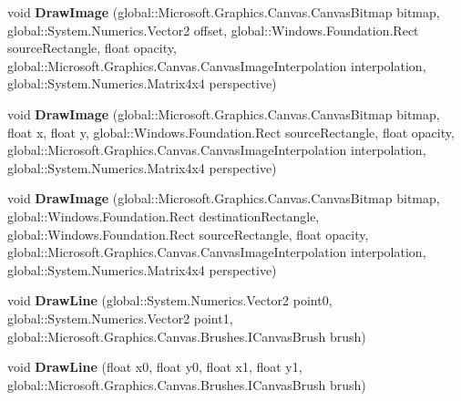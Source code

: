 \begin{DoxyCompactItemize}
void {\bfseries Draw\+Image} (global\+::\+Microsoft.\+Graphics.\+Canvas.\+Canvas\+Bitmap bitmap, global\+::\+System.\+Numerics.\+Vector2 offset, global\+::\+Windows.\+Foundation.\+Rect source\+Rectangle, float opacity, global\+::\+Microsoft.\+Graphics.\+Canvas.\+Canvas\+Image\+Interpolation interpolation, global\+::\+System.\+Numerics.\+Matrix4x4 perspective)
\item 
\mbox{\label{interface_microsoft_1_1_graphics_1_1_canvas_1_1_i_canvas_drawing_session_a54c1165443e61a4fb85bec846c49b766}} 
void {\bfseries Draw\+Image} (global\+::\+Microsoft.\+Graphics.\+Canvas.\+Canvas\+Bitmap bitmap, float x, float y, global\+::\+Windows.\+Foundation.\+Rect source\+Rectangle, float opacity, global\+::\+Microsoft.\+Graphics.\+Canvas.\+Canvas\+Image\+Interpolation interpolation, global\+::\+System.\+Numerics.\+Matrix4x4 perspective)
\item 
\mbox{\label{interface_microsoft_1_1_graphics_1_1_canvas_1_1_i_canvas_drawing_session_a7a0435e8e3e350ce01e58979f448a53d}} 
void {\bfseries Draw\+Image} (global\+::\+Microsoft.\+Graphics.\+Canvas.\+Canvas\+Bitmap bitmap, global\+::\+Windows.\+Foundation.\+Rect destination\+Rectangle, global\+::\+Windows.\+Foundation.\+Rect source\+Rectangle, float opacity, global\+::\+Microsoft.\+Graphics.\+Canvas.\+Canvas\+Image\+Interpolation interpolation, global\+::\+System.\+Numerics.\+Matrix4x4 perspective)
\item 
\mbox{\label{interface_microsoft_1_1_graphics_1_1_canvas_1_1_i_canvas_drawing_session_a5873fbca4b82b0953078150102fb9000}} 
void {\bfseries Draw\+Line} (global\+::\+System.\+Numerics.\+Vector2 point0, global\+::\+System.\+Numerics.\+Vector2 point1, global\+::\+Microsoft.\+Graphics.\+Canvas.\+Brushes.\+I\+Canvas\+Brush brush)
\item 
\mbox{\label{interface_microsoft_1_1_graphics_1_1_canvas_1_1_i_canvas_drawing_session_acf7fd73b7fc5a481b09e3ea4d14d4d59}} 
void {\bfseries Draw\+Line} (float x0, float y0, float x1, float y1, global\+::\+Microsoft.\+Graphics.\+Canvas.\+Brushes.\+I\+Canvas\+Brush brush)
\item 

\end{DoxyCompactItemize}
